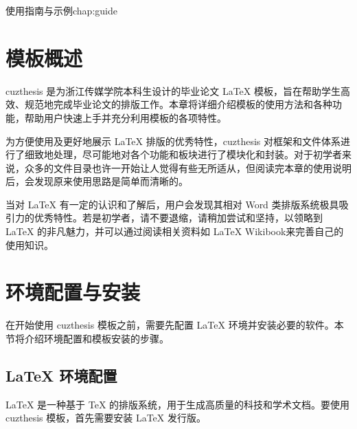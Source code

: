 \begin{cuzchapter}{使用指南与示例}{chap:guide}


    \section{模板概述}\label{sec:overview}

    cuzthesis 是为浙江传媒学院本科生设计的毕业论文 LaTeX 模板，旨在帮助学生高效、规范地完成毕业论文的排版工作。本章将详细介绍模板的使用方法和各种功能，帮助用户快速上手并充分利用模板的各项特性。

    为方便使用及更好地展示 LaTeX 排版的优秀特性，cuzthesis 对框架和文件体系进行了细致地处理，尽可能地对各个功能和板块进行了模块化和封装。对于初学者来说，众多的文件目录也许一开始让人觉得有些无所适从，但阅读完本章的使用说明后，会发现原来使用思路是简单而清晰的。

    当对 LaTeX 有一定的认识和了解后，用户会发现其相对 Word 类排版系统极具吸引力的优秀特性。若是初学者，请不要退缩，请稍加尝试和坚持，以领略到 LaTeX 的非凡魅力，并可以通过阅读相关资料如 LaTeX Wikibook\citep{wikibook2014latex}来完善自己的使用知识。

    \section{环境配置与安装}\label{sec:installation}

    在开始使用 cuzthesis 模板之前，需要先配置 LaTeX 环境并安装必要的软件。本节将介绍环境配置和模板安装的步骤。

    \subsection{LaTeX 环境配置}\label{sub:latex-environment}

    LaTeX 是一种基于 TeX 的排版系统，用于生成高质量的科技和学术文档。要使用 cuzthesis 模板，首先需要安装 LaTeX 发行版。


\end{cuzchapter}

